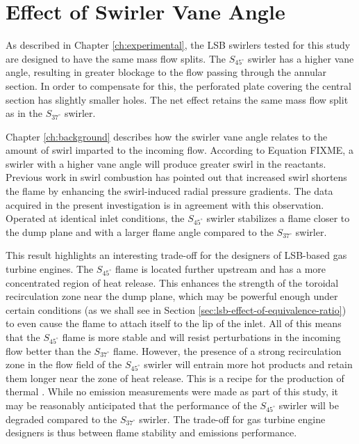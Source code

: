 \section{Effect of Swirler Vane Angle}
\label{sec:lsb-effect-of-swirler-vane-angle}

As described in Chapter \ref{ch:experimental}, the LSB swirlers tested for this study are designed to have the same mass flow splits.
The \(S_{45^\circ}\) swirler has a higher vane angle, resulting in greater blockage to the flow passing through the annular section.
In order to compensate for this, the perforated plate covering the central section has slightly smaller holes.
The net effect retains the same mass flow split as in the \(S_{37^\circ}\) swirler.

Chapter \ref{ch:background} describes how the swirler vane angle relates to the amount of swirl imparted to the incoming flow.
According to Equation FIXME, a swirler with a higher vane angle will produce greater swirl in the reactants.
Previous work in swirl combustion\cite{1992-chan,1986-starner} has pointed out that increased swirl shortens the flame by enhancing the swirl-induced radial pressure gradients.
The data acquired in the present investigation is in agreement with this observation.
Operated at identical inlet conditions, the \(S_{45^\circ}\) swirler stabilizes a flame closer to the dump plane and with a larger flame angle compared to the \(S_{37^\circ}\) swirler.

This result highlights an interesting trade-off for the designers of LSB-based gas turbine engines.
The \(S_{45^\circ}\) flame is located further upstream and has a more concentrated region of heat release.
This enhances the strength of the toroidal recirculation zone near the dump plane, which may be powerful enough under certain conditions (as we shall see in Section \ref{sec:lsb-effect-of-equivalence-ratio}) to even cause the flame to attach itself to the lip of the inlet.
All of this means that the \(S_{45^\circ}\) flame is more stable and will resist perturbations in the incoming flow better than the \(S_{37^\circ}\) flame.
However, the presence of a strong recirculation zone in the flow field of the \(S_{45^\circ}\) swirler will entrain more hot products and retain them longer near the zone of heat release.
This is a recipe for the production of thermal .
While no emission measurements were made as part of this study, it may be reasonably anticipated that the  performance of the \(S_{45^\circ}\) swirler will be degraded compared to the \(S_{37^\circ}\) swirler.
The trade-off for gas turbine engine designers is thus between flame stability and emissions performance.

